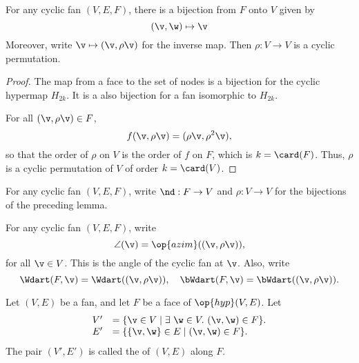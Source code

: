 
\begin{lemma}  
For any cyclic fan $(V,E,F)$, there is a bijection from $F$ onto $V$
given by
\begin{displaymath}
(\v,\w) \mapsto \v
\end{displaymath}
Moreover, write $\v\mapsto(\v,\rho\v)$ for the inverse map. 
Then $\rho:V\to V$ is a cyclic permutation.
\end{lemma}
%

\begin{proof} The map from a face to the set of nodes is a bijection
for the cyclic hypermap $H_{2k}$. It is a also bijection for a fan isomorphic
to $H_{2k}$.

For all $(\v,\rho \v)\in F$,
\begin{displaymath}
f(\v,\rho \v) = (\rho\v,\rho^2\v),
\end{displaymath}
so that the order of $\rho$ on $V$ is the order of $f$ on $F$, which
is $k=\card(F)$.  Thus, $\rho$ is a cyclic permutation of $V$ of order
$k=\card(V)$.
\end{proof}

\begin{definition}[$\rho$,~$\v$] For any cyclic fan $(V,E,F)$, write
$\nd:F\to V$ and $\rho:V\to V$ for the bijections of the preceding
lemma.
\end{definition}
%
%

\begin{definition}
For any cyclic fan $(V,E,F)$,
write
\begin{displaymath}
\angle(\v) = \op{azim}((\v,\rho\v)),
\end{displaymath}
for all $\v\in V$.  This is the  angle of the cyclic
fan at $\v$.  Also, write
\begin{displaymath}
  \Wdart(F,\v) = \Wdart((\v,\rho \v)),\quad 
\bWdart(F,\v) =\bWdart((\v,\rho \v)).
\end{displaymath}
%
%
%
\end{definition}


\begin{definition}[localization] Let $(V,E)$ be a fan, and let $F$ be
a face of $\op{hyp}(V,E)$.  Let
\begin{displaymath}
\begin{array}{rll}
V' &= \{\v\in V \mid \exists~\w\in V.~(\v,\w)\in F\}.\\
E' &= \{\{\v,\w\} \in E\mid (\v,\w)\in F\}.
\end{array}
\end{displaymath}
The pair $(V',E')$ is called the  of $(V,E)$
along $F$.
\end{definition}
%


